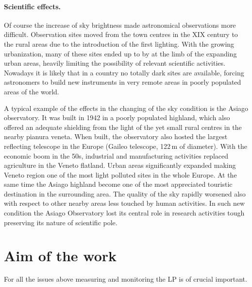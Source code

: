 \documentclass[a4paper, titlepage, 10pt]{book}
\begin{document}
\paragraph{Scientific effects.} Of course the increase of sky brightness made astronomical observations more difficult. Observation sites moved from the town centres in the XIX century to the rural areas due to the introduction of the first lighting. With the growing urbanization, many of these sites ended up to by at the limb of the expanding urban areas, heavily limiting the possibility of relevant scientific activities. Nowadays it is likely that in a country no totally dark sites are available, forcing astronomers to build new instruments in very remote areas in poorly populated areas of the world.

A typical example of the effects in the changing of the sky condition is the Asiago observatory. It was built in 1942 in a poorly populated highland, which also offered an adequate shielding from the light of the yet small rural centres in the nearby pianura veneta. When built, the observatory also hosted the largest reflecting telescope in the Europe (Gaileo telescope, 122\,m of diameter).
With the economic boom in the 50s, industrial and manufacturing activities replaced agriculture in the Veneto flatland. Urban areas significantly expanded making Veneto region one of the most light polluted sites in the whole Europe. At the same time the Asiago highland become one of the most appreciated touristic destination in the surrounding area. The quality of the sky rapidly worsened also with respect to other nearby areas less touched by human activities. In such new condition the Asiago Observatory lost its central role in research activities tough preserving its nature of scientific pole.

\section{Aim of the work}
For all the issues above measuring and monitoring the LP is of crucial important. 





\end{document}
